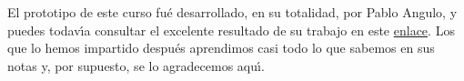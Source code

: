  El prototipo de este curso fu\'e desarrollado, en su totalidad,  por Pablo
 Angulo, y puedes todav\'{\i}a consultar el excelente resultado de su trabajo en
 este  \href{http://verso.mat.uam.es/~pablo.angulo/doc/laboratorio/}{enlace}. Los que lo hemos impartido despu\'es aprendimos casi todo lo que sabemos en sus notas y, por supuesto, se lo agradecemos aqu\'{\i}. 
 
 
 
 
 
 
 \smallskip




\begin{comment}
{\sc Algunos consejos}


No deja de ser una perogrullada  afirmar que para superar un curso en el que
la programaci\'on juega un papel destacado hay que programar, por uno mismo,
sistem\'aticamente. Dicho de otra manera, {\itshape se aprende a programar
programando.}

M\'as concretamente,
\begin{enumerate}
 \item No suele servir {\itshape cortar y pegar}  c\'odigos escritos por
otros. Frecuentemente esa manera de trabajar produce errores  en el
c\'odigo resultante, en ocasiones dif\'{\i}ciles de arreglar.

\item Antes de poder programar un algoritmo es necesario {\itshape entenderlo
bien}. Uno se da cuenta de que no entiende bien el algoritmo cuando encuentra
dificultades para expresarlo como un programa. En tales casos suele ser de ayuda
ejecutar {\itshape a mano} el algoritmo para valores muy bajos de sus
par\'ametros. 

\item Es f\'acil convencerse de que se ha comprendido un c\'odigo, escrito por
otros, que funciona correctamente. Sin embargo, frecuentemente s\'olo se
consigue una buena comprensi\'on comparando en detalle nuestro c\'odigo,
correcto o no, con otras soluciones, por ejemplo las del  profesor. 

\item Siempre hay que intentar comprobar las soluciones que produce nuestro
c\'odigo. Para valores bajos de los par\'ametros del c\'odigo podemos intentar
 {\itshape calcular a mano} las soluciones para comparar, y, en general, es
bueno pensar siempre si las soluciones obtenidas se ajustan a lo que
podr\'{\i}amos esperar {\itshape a priori.}
 
 
 

\end{comment}
